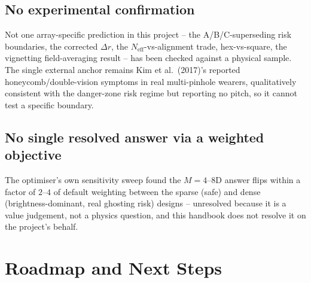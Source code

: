 \documentclass[11pt]{report}
\newcommand{\Neff}{N_{\text{eff}}}
\begin{document}
\section{No experimental confirmation}
Not one array-specific prediction in this project -- the A/B/C-superseding risk boundaries,
the corrected $\Delta r$, the $\Neff$-vs-alignment trade, hex-vs-square, the vignetting
field-averaging result -- has been checked against a physical sample. The single external
anchor remains Kim et al.\ (2017)'s reported honeycomb/double-vision symptoms in real
multi-pinhole wearers, qualitatively consistent with the danger-zone risk regime but reporting
no pitch, so it cannot test a specific boundary.

\section{No single resolved answer via a weighted objective}
The optimiser's own sensitivity sweep found the $M{=}4$--$8$D answer flips within a factor of
$2$--$4$ of default weighting between the sparse (safe) and dense (brightness-dominant, real
ghosting risk) designs -- unresolved because it is a value judgement, not a physics question,
and this handbook does not resolve it on the project's behalf.

\chapter{Roadmap and Next Steps}
\end{document}
